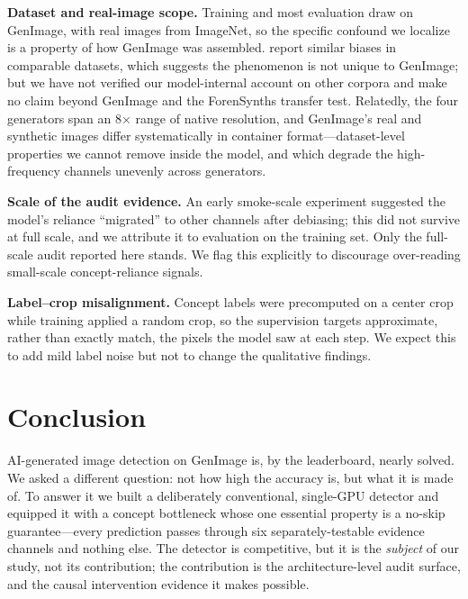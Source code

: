 \textbf{Dataset and real-image scope.} Training and most evaluation draw on GenImage, with real images from ImageNet, so the specific confound we localize is a property of how GenImage was assembled. \citet{grommelt2024fakejpeg} report similar biases in comparable datasets, which suggests the phenomenon is not unique to GenImage; but we have not verified our model-internal account on other corpora and make no claim beyond GenImage and the ForenSynths transfer test. Relatedly, the four generators span an 8\ensuremath{\times} range of native resolution, and GenImage's real and synthetic images differ systematically in container format---dataset-level properties we cannot remove inside the model, and which degrade the high-frequency channels unevenly across generators.

\textbf{Scale of the audit evidence.} An early smoke-scale experiment suggested the model's reliance ``migrated'' to other channels after debiasing; this did not survive at full scale, and we attribute it to evaluation on the training set. Only the full-scale audit reported here stands. We flag this explicitly to discourage over-reading small-scale concept-reliance signals.

\textbf{Label--crop misalignment.} Concept labels were precomputed on a center crop while training applied a random crop, so the supervision targets approximate, rather than exactly match, the pixels the model saw at each step. We expect this to add mild label noise but not to change the qualitative findings.

\section{Conclusion}

AI-generated image detection on GenImage is, by the leaderboard, nearly solved. We asked a different question: not how high the accuracy is, but what it is made of. To answer it we built a deliberately conventional, single-GPU detector and equipped it with a concept bottleneck whose one essential property is a no-skip guarantee---every prediction passes through six separately-testable evidence channels and nothing else. The detector is competitive, but it is the \emph{subject} of our study, not its contribution; the contribution is the architecture-level audit surface, and the causal intervention evidence it makes possible.

